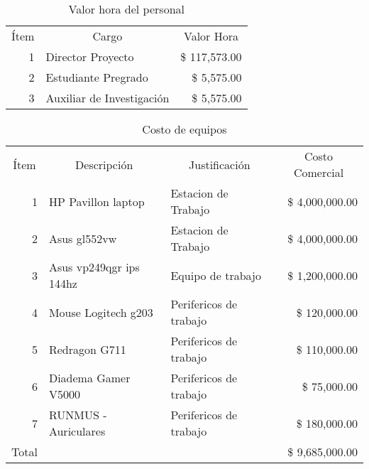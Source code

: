 \begin{table}[H]
    \centering
    \caption{Valor hora del personal}
    \footnotesize
    \begin{tabular}{rlr}
        \hline
        \multicolumn{1}{c}{Ítem} & \multicolumn{1}{c}{Cargo} & \multicolumn{1}{c}{Valor Hora} \bigstrut\\
        \cline{2-3}1 & Director Proyecto &  \$          117,573.00  \bigstrut[t]\\
        2 & Estudiante Pregrado &  \$               5,575.00  \\
        3 & Auxiliar de Investigación &  \$               5,575.00  \bigstrut[b]\\
        \hline
    \end{tabular}%
    \label{tab:valorhora}
\end{table}%

\begin{table}[H]
    \centering
    \caption{Costo de equipos}
    \footnotesize
    \begin{tabular}{crrr}
        \hline
        Ítem & \multicolumn{1}{c}{Descripción} & \multicolumn{1}{c}{Justificación} & \multicolumn{1}{c}{Costo Comercial} \bigstrut\\
        \cline{2-4}\multicolumn{1}{r}{1} & \multicolumn{1}{l}{HP Pavillon laptop} & \multicolumn{1}{l}{Estacion de Trabajo} &  \$   4,000,000.00  \bigstrut[t]\\
        \multicolumn{1}{r}{2} & \multicolumn{1}{l}{Asus gl552vw} & \multicolumn{1}{l}{Estacion de Trabajo} &  \$   4,000,000.00  \\
        \multicolumn{1}{r}{3} & \multicolumn{1}{l}{Asus vp249qgr ips 144hz} & \multicolumn{1}{l}{Equipo de trabajo} &  \$   1,200,000.00  \\
        \multicolumn{1}{r}{4} & \multicolumn{1}{l}{Mouse Logitech g203} & \multicolumn{1}{l}{Perifericos de trabajo} &  \$      120,000.00  \\
        \multicolumn{1}{r}{5} & \multicolumn{1}{l}{Redragon G711} & \multicolumn{1}{l}{Perifericos de trabajo} &  \$      110,000.00  \\
        \multicolumn{1}{r}{6} & \multicolumn{1}{l}{Diadema Gamer V5000} & \multicolumn{1}{l}{Perifericos de trabajo} &  \$        75,000.00  \\
        \multicolumn{1}{r}{7} & \multicolumn{1}{l}{RUNMUS - Auriculares} & \multicolumn{1}{l}{Perifericos de trabajo} &  \$      180,000.00  \bigstrut[b]\\
        \cline{2-4}Total &   &   &  \$   9,685,000.00  \bigstrut\\
        \hline
    \end{tabular}%
  \label{tab:compraequipos}%
\end{table}%

